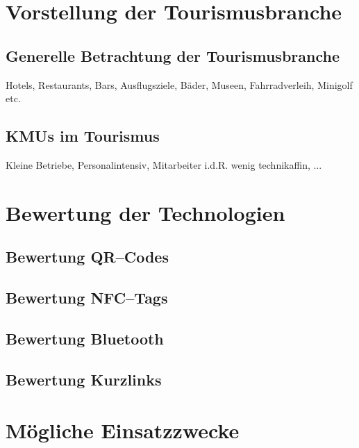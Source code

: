 \section{Vorstellung der Tourismusbranche}
\label{sec:hauptteil}
\label{sec:tourismusbranche}

\subsection{Generelle Betrachtung der Tourismusbranche}
Hotels, Restaurants, Bars, Ausflugsziele, Bäder, Museen, Fahrradverleih, Minigolf etc.


\subsection{KMUs im Tourismus}
Kleine Betriebe, Personalintensiv, Mitarbeiter i.d.R. wenig technikaffin, ...

\section{Bewertung der Technologien}
\label{sec:bewertung}

\subsection{Bewertung QR–Codes}
\subsection{Bewertung NFC--Tags}
\subsection{Bewertung Bluetooth}
\subsection{Bewertung Kurzlinks}

\section{Mögliche Einsatzzwecke}
\label{sec:einsatzzwecke}

